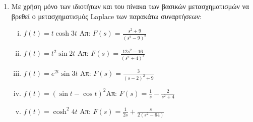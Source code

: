 


\usepackage[RPvoltages]{circuitikz}
\everymath{\displaystyle}


\geometry{left=15.63mm,right=15.63mm,top=36.25mm,bottom=33.25mm,
footskip=24.16mm,headsep=24.16mm}

\pagestyle{vangelis}





\begin{center}
  \minibox{\large\bfseries \textcolor{Col1}{Μηχανικές και Ηλεκτρικές ταλαντώσεις}}
\end{center}

\vspace{\baselineskip}

\begin{enumerate}

  \item Με χρήση μόνο των ιδιοτήτων και του πίνακα των βασικών μετασχηματισμών να 
    βρεθεί ο μετασχηματισμός Laplace των παρακάτω συναρτήσεων:
    \begin{enumerate}[i)]
      \item $ f(t) = t \cosh{3t} $ \hfill Απ: $ F(s) = \frac{s^{2}+9}{(s^{2}-9)^{2}} $ 
      \item $ f(t) = t^{2} \sin{2t} $ \hfill Απ: $F(s)=\frac{12s^{2}-16}{(s^{2}+4)^{3}}$
      \item $f(t)=e^{2t}\sin 3t$ \hfill Απ: $F(s)=\frac{3}{(s-2)^2+9}$
      \item $f(t)=(\sin t-\cos t)^2$\hfill Απ: $F(s)=\frac{1}{s}-\frac{2}{s^2+4}$
      \item $f(t)=\cosh^2 4t$ \hfill Απ: $F(s)=\frac{1}{2s}+\frac{s}{2(s^2-64)}$
    \end{enumerate}


\end{enumerate}
